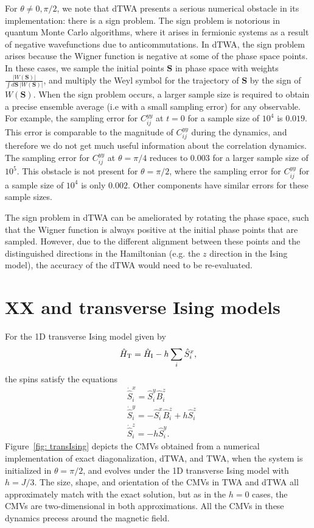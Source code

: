 \documentclass[pra,reprint,superscriptaddress]{revtex4-1}
\newcommand{\hS}{\hat{S}}
\newcommand{\hB}{\hat{B}}
\begin{document}
For $\theta\neq0,\pi/2$, we note that dTWA presents a serious numerical obstacle in its implementation: there is a sign problem. The sign problem is notorious in quantum Monte Carlo algorithms, where it arises in fermionic systems as a result of negative wavefunctions due to anticommutations. In dTWA, the sign problem arises because the Wigner function is negative at some of the phase space points. In these cases, we sample the initial points $\mathbf{S}$ in phase space with weights $\frac{\left|W(\mathbf{S})\right|}{\int\! d\mathbf{S}~\left|W(\mathbf{S})\right|}$, and multiply the Weyl symbol for the trajectory of $\mathbf{S}$ by the sign of $W(\mathbf{S})$. When the sign problem occurs, a larger sample size is required to obtain a precise ensemble average (i.e with a small sampling error) for any observable. For example, the sampling error for $C^{yy}_{ij}$ at $t=0$ for a sample size of $10^4$ is $0.019$. This error is comparable to the magnitude of $C^{yy}_{ij}$ during the dynamics, and therefore we do not get much useful information about the correlation dynamics. The sampling error for $C^{yy}_{ij}$ at $\theta=\pi/4$ reduces to $0.003$ for a larger sample size of $10^5$. This obstacle is not present for $\theta=\pi/2$, where the sampling error for $C^{yy}_{ij}$ for a sample size of $10^4$ is only $0.002$. Other components have similar errors for these sample sizes.

The sign problem in dTWA can be ameliorated by rotating the phase space, such that the Wigner function is always positive at the initial phase points that are sampled. However, due to the different alignment between these points and the distinguished directions in the Hamiltonian (e.g. the $z$ direction in the Ising model), the accuracy of the dTWA would need to be re-evaluated. 

\section{XX and transverse Ising models}\label{sec: other} 

For the 1D transverse Ising model given by
\begin{equation}\label{eqn: HtransIsing}
\hat{H}_{\rm T} = \hat{H}_{\rm I} - h \sum_i \hS^x_i,
\end{equation}
the spins satisfy the equations
\begin{align}\label{eqn: transIsingEOM}
&\dot{\hS}_i^x = \hS_i^y \hB_i^z\nonumber\\
&\dot{\hS}_i^y = - \hS_i^x \hB_i^z + h \hS_i^z\\
&\dot{\hS}_i^z = - h \hS_i^y.\nonumber
\end{align}
Figure~\ref{fig: transIsing} depicts the CMVs obtained from a numerical implementation of exact diagonalization, dTWA, and TWA, when the system is initialized in $\theta=\pi/2$, and evolves under the 1D transverse Ising model with $h=J/3$. The size, shape, and orientation of the CMVs in TWA and dTWA all approximately match with the exact solution, but as in the $h=0$ cases, the CMVs are two-dimensional in both approximations. All the CMVs in these dynamics precess around the magnetic field.
\end{document}
